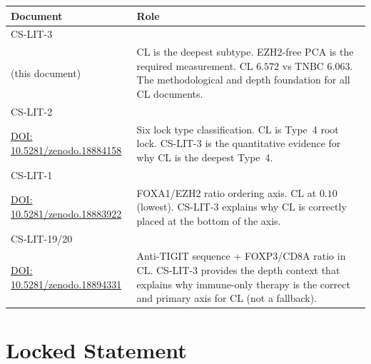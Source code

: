 \documentclass[12pt, a4paper]{article}
\begin{document}
\begin{center}
\begin{tabular}{p{2.8cm}p{8.5cm}}
\toprule
\textbf{Document} & \textbf{Role} \\
\midrule
CS-LIT-3\\(this document) &
CL is the deepest subtype. EZH2-free PCA is the
required measurement. CL $6.572$ vs TNBC $6.063$.
The methodological and depth foundation for all
CL documents. \\[0.5em]
CS-LIT-2\\
\href{https://doi.org/10.5281/zenodo.18884158}
{DOI: 10.5281/zenodo.18884158} &
Six lock type classification. CL is Type~4 root
lock. CS-LIT-3 is the quantitative evidence for
why CL is the deepest Type~4. \\[0.5em]
CS-LIT-1\\
\href{https://doi.org/10.5281/zenodo.18883922}
{DOI: 10.5281/zenodo.18883922} &
FOXA1/EZH2 ratio ordering axis. CL at $0.10$
(lowest). CS-LIT-3 explains why CL is correctly
placed at the bottom of the axis. \\[0.5em]
CS-LIT-19/20\\
\href{https://doi.org/10.5281/zenodo.18894331}
{DOI: 10.5281/zenodo.18894331} &
Anti-TIGIT sequence + FOXP3/CD8A ratio in CL.
CS-LIT-3 provides the depth context that explains
why immune-only therapy is the correct and primary
axis for CL (not a fallback). \\
\bottomrule
\end{tabular}
\end{center}

\section{Locked Statement}
\end{document}
